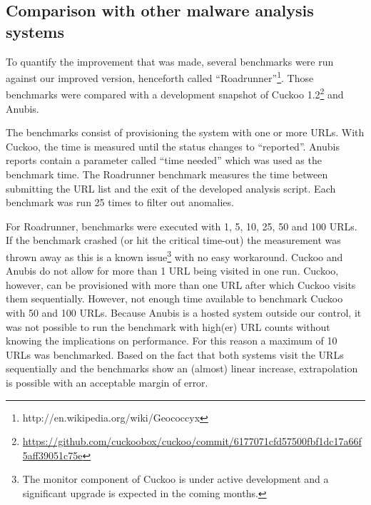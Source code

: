 \pagebreak

\restoregeometry
{}
\setcounter{page}{\thesavepage}

\subsection{Comparison with other malware analysis systems}

To quantify the improvement that was made, several benchmarks were run against our improved version, henceforth called ``Roadrunner''\footnote{http://en.wikipedia.org/wiki/Geococcyx}. Those benchmarks were compared with a development snapshot of Cuckoo 1.2\footnote{\url{https://github.com/cuckoobox/cuckoo/commit/6177071cfd57500fbf1dc17a66f5aff39051c75e}} and Anubis. %

The benchmarks consist of provisioning the system with one or more URLs. With Cuckoo, the time is measured until the status changes to ``reported''. Anubis reports contain a parameter called ``time needed'' which was used as the benchmark time. The Roadrunner benchmark measures the time between submitting the URL list and the exit of the developed analysis script. Each benchmark was run 25 times to filter out anomalies.

For Roadrunner, benchmarks were executed with 1, 5, 10, 25, 50 and 100 URLs. If the benchmark crashed (or hit the critical time-out) the measurement was thrown away as this is a known issue\footnote{The monitor component of Cuckoo is under active development and a significant upgrade is expected in the coming months.} with no easy workaround. Cuckoo and Anubis do not allow for more than 1 URL being visited in one run. Cuckoo, however, can be provisioned with more than one URL after which Cuckoo visits them sequentially. However, not enough time available to benchmark Cuckoo with 50 and 100 URLs. Because Anubis is a hosted system outside our control, it was not possible to run the benchmark with high(er) URL counts without knowing the implications on performance. For this reason a maximum of 10 URLs was benchmarked.  Based on the fact that both systems visit the URLs sequentially and the benchmarks show an (almost) linear increase, extrapolation is possible with an acceptable margin of error.

